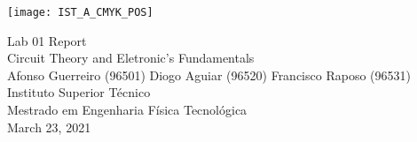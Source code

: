 
\thispagestyle {empty}

\texttt{[image: IST\_A\_CMYK\_POS]}

\begin{center}
%
\vspace{1.0cm}

\vspace{1cm}
{\FontLb Lab 01 Report} \\ %
{\FontSn Circuit Theory and Eletronic's Fundamentals} \\ %
\vspace{1cm}
{\FontSn Afonso Guerreiro (96501) Diogo Aguiar (96520) Francisco Raposo (96531) \\Instituto Superior Técnico\\ Mestrado em Engenharia Física Tecnológica\\}
\vspace{1cm}
{\FontSn March 23, 2021} \\ %
%
\end{center}

